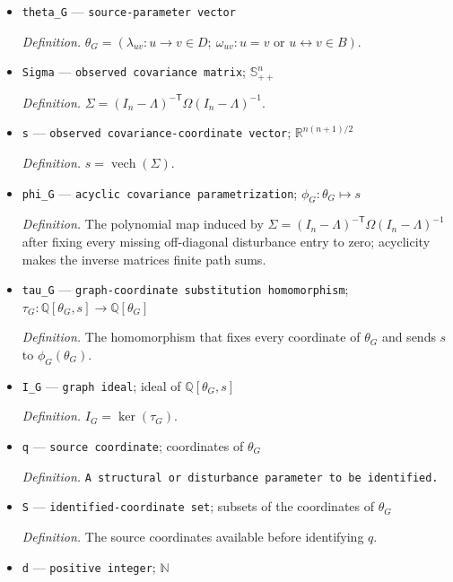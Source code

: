 \documentclass{article}
\begin{document}
\begin{itemize}
  \item \texttt{theta\_\allowbreak{}G} --- \texttt{source-\allowbreak{}parameter vector}
  \par\smallskip\noindent\emph{Definition.} \(\theta_G=(\lambda_{uv}:u\to v\in D;\ \omega_{uv}:u=v\text{ or }u\leftrightarrow v\in B)\).
  \item \texttt{Sigma} --- \texttt{observed covariance matrix}; \(\mathbb S_{++}^{n}\)
  \par\smallskip\noindent\emph{Definition.} \(\Sigma=(I_n-\Lambda)^{-\mathsf T}\Omega(I_n-\Lambda)^{-1}\).
  \item \texttt{s} --- \texttt{observed covariance-\allowbreak{}coordinate vector}; \(\mathbb R^{n(n+1)/2}\)
  \par\smallskip\noindent\emph{Definition.} \(s=\operatorname{vech}(\Sigma)\).
  \item \texttt{phi\_\allowbreak{}G} --- \texttt{acyclic covariance parametrization}; \(\phi_G:\theta_G\mapsto s\)
  \par\smallskip\noindent\emph{Definition.} The polynomial map induced by \(\Sigma=(I_n-\Lambda)^{-\mathsf T}\Omega(I_n-\Lambda)^{-1}\) after fixing every missing off-diagonal disturbance entry to zero; acyclicity makes the inverse matrices finite path sums.
  \item \texttt{tau\_\allowbreak{}G} --- \texttt{graph-\allowbreak{}coordinate substitution homomorphism}; \(\tau_G:\mathbb Q[\theta_G,s]\to\mathbb Q[\theta_G]\)
  \par\smallskip\noindent\emph{Definition.} The homomorphism that fixes every coordinate of \(\theta_G\) and sends \(s\) to \(\phi_G(\theta_G)\).
  \item \texttt{I\_\allowbreak{}G} --- \texttt{graph ideal}; ideal of \(\mathbb Q[\theta_G,s]\)
  \par\smallskip\noindent\emph{Definition.} \(I_G=\ker(\tau_G)\).
  \item \texttt{q} --- \texttt{source coordinate}; coordinates of \(\theta_G\)
  \par\smallskip\noindent\emph{Definition.} \texttt{A structural or disturbance parameter to be identified.}
  \item \texttt{S} --- \texttt{identified-\allowbreak{}coordinate set}; subsets of the coordinates of \(\theta_G\)
  \par\smallskip\noindent\emph{Definition.} The source coordinates available before identifying \(q\).
  \item \texttt{d} --- \texttt{positive integer}; \(\mathbb N\)

\end{itemize}
\end{document}
